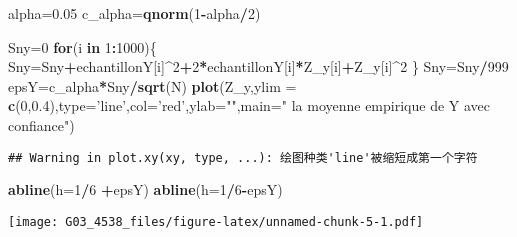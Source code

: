 \documentclass[]{article}
\newenvironment{Shaded}{\begin{snugshade}}{\end{snugshade}}
\newcommand{\KeywordTok}[1]{\textcolor[rgb]{0.13,0.29,0.53}{\textbf{#1}}}
\newcommand{\DataTypeTok}[1]{\textcolor[rgb]{0.13,0.29,0.53}{#1}}
\newcommand{\DecValTok}[1]{\textcolor[rgb]{0.00,0.00,0.81}{#1}}
\newcommand{\FloatTok}[1]{\textcolor[rgb]{0.00,0.00,0.81}{#1}}
\newcommand{\StringTok}[1]{\textcolor[rgb]{0.31,0.60,0.02}{#1}}
\newcommand{\ControlFlowTok}[1]{\textcolor[rgb]{0.13,0.29,0.53}{\textbf{#1}}}
\newcommand{\OperatorTok}[1]{\textcolor[rgb]{0.81,0.36,0.00}{\textbf{#1}}}
\newcommand{\NormalTok}[1]{#1}
\begin{document}
\begin{Shaded}
\begin{Highlighting}[]
\NormalTok{alpha=}\FloatTok{0.05}
\NormalTok{c_alpha=}\KeywordTok{qnorm}\NormalTok{(}\DecValTok{1}\OperatorTok{-}\NormalTok{alpha}\OperatorTok{/}\DecValTok{2}\NormalTok{)}

\NormalTok{Sny=}\DecValTok{0}  
\ControlFlowTok{for}\NormalTok{(i }\ControlFlowTok{in} \DecValTok{1}\OperatorTok{:}\DecValTok{1000}\NormalTok{)\{}
\NormalTok{  Sny=Sny}\OperatorTok{+}\NormalTok{echantillonY[i]}\OperatorTok{^}\DecValTok{2}\OperatorTok{+}\DecValTok{2}\OperatorTok{*}\NormalTok{echantillonY[i]}\OperatorTok{*}\NormalTok{Z_y[i]}\OperatorTok{+}\NormalTok{Z_y[i]}\OperatorTok{^}\DecValTok{2}
\NormalTok{\}}
\NormalTok{Sny=Sny}\OperatorTok{/}\DecValTok{999}
\NormalTok{epsY=c_alpha}\OperatorTok{*}\NormalTok{Sny}\OperatorTok{/}\KeywordTok{sqrt}\NormalTok{(N)}
\KeywordTok{plot}\NormalTok{(Z_y,}\DataTypeTok{ylim =} \KeywordTok{c}\NormalTok{(}\DecValTok{0}\NormalTok{,}\FloatTok{0.4}\NormalTok{),}\DataTypeTok{type=}\StringTok{'line'}\NormalTok{,}\DataTypeTok{col=}\StringTok{'red'}\NormalTok{,}\DataTypeTok{ylab=}\StringTok{""}\NormalTok{,}\DataTypeTok{main=}\StringTok{" la moyenne empirique de Y avec confiance"}\NormalTok{)}
\end{Highlighting}
\end{Shaded}

\begin{verbatim}
## Warning in plot.xy(xy, type, ...): 绘图种类'line'被缩短成第一个字符
\end{verbatim}

\begin{Shaded}
\begin{Highlighting}[]
\KeywordTok{abline}\NormalTok{(}\DataTypeTok{h=}\DecValTok{1}\OperatorTok{/}\DecValTok{6} \OperatorTok{+}\NormalTok{epsY)}
\KeywordTok{abline}\NormalTok{(}\DataTypeTok{h=}\DecValTok{1}\OperatorTok{/}\DecValTok{6}\OperatorTok{-}\NormalTok{epsY)}
\end{Highlighting}
\end{Shaded}

\texttt{[image: G03\_4538\_files/figure-latex/unnamed-chunk-5-1.pdf]}
\end{document}
